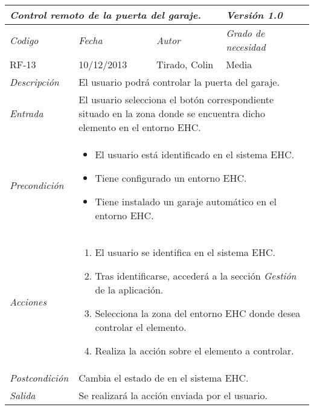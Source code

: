 \begin{center}
    \begin{tabular}{|p{3cm}|p{4cm}|p{4cm}|p{4cm}|}
    \hline \multicolumn{3}{|p{9cm}|}{\textit{Control remoto de la puerta del garaje.}} & \textit{Versi\'on 1.0} \\
    \hline \textit{Codigo} & \textit{Fecha} & \textit{Autor} & \textit{Grado de necesidad} \\
    RF-13 & 10/12/2013 & Tirado, Colin & Media \\
    \hline \textit{Descripci\'on} & \multicolumn{3}{|p{9cm}|}{El usuario podr\'a controlar la puerta del garaje.} \\
    \hline \textit{Entrada} & \multicolumn{3}{|p{9cm}|}{El usuario selecciona el bot\'on correspondiente situado en la zona donde se encuentra dicho elemento en el entorno EHC.} \\
    \hline \textit{Precondici\'on} & \multicolumn{3}{|p{9cm}|}{
    \begin{itemize}
    \item El usuario est\'a identificado en el sistema EHC.
    \item Tiene configurado un entorno EHC.
    \item Tiene instalado un garaje autom\'atico en el entorno EHC.
    \end{itemize}
    } \\
    \hline \textit{Acciones} & \multicolumn{3}{|p{9cm}|}{
    \begin{enumerate}
    \item El usuario se identifica en el sistema EHC.
    \item Tras identificarse, acceder\'a a la secci\'on \textit{Gesti\'on} de la aplicaci\'on.
    \item Selecciona la zona del entorno EHC donde desea controlar el elemento.
    \item Realiza la acci\'on sobre el elemento a controlar.
    \end{enumerate}
    } \\
    \hline \textit{Postcondici\'on} & \multicolumn{3}{|p{9cm}|}{Cambia el estado de  en el sistema EHC.} \\
    \hline \textit{Salida} & \multicolumn{3}{|p{9cm}|}{Se realizar\'a la acci\'on enviada por el usuario.} \\ \hline
    \end{tabular}
\end{center}
